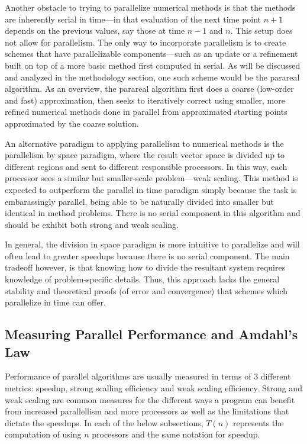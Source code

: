 \documentclass[letterpaper,12pt]{article}
\begin{document}
Another obstacle to trying to parallelize numerical methods is that the methods
are inherently serial in time---in that evaluation of the next time point $n+1$
depends on the previous values, say those at time $n-1$ and $n$. This setup
does not allow for parallelism. The only way to incorporate parallelism is to
create schemes that have parallelizable components---such as an update or a
refinement built on top of a more basic method first computed in serial. As will be discussed and analyzed in the
methodology section, one such scheme would be the parareal algorithm. As an
overview, the parareal algorithm first does a coarse (low-order and fast)
approximation, then seeks to iteratively correct using smaller, more refined
numerical methods done in parallel from approximated starting points
approximated by the coarse solution.

An alternative paradigm to applying parallelism to numerical methods is the
parallelism by space paradigm, where the result vector space is divided up to
different regions and sent to different responsible processors. In this way,
each processor sees a similar but smaller-scale problem---weak scaling. This
method is expected to outperform the parallel in time paradigm simply because
the task is embarassingly parallel, being able to be naturally divided
into smaller but identical in method problems. There is no serial component in
this algorithm and should be exhibit both strong and weak scaling.

In general, the division in space paradigm is more intuitive to parallelize and
will often lead to greater speedups because there is no serial component. The main tradeoff however, is that knowing how to divide the resultant system requires knowledge of problem-specific details. Thus, this approach lacks the
general stability and theoretical proofs (of error and convergence) that schemes which parallelize in
time can offer.

\subsection{Measuring Parallel Performance and Amdahl's Law}

Performance of parallel algorithms are usually measured in terms of 3 different metrics: speedup, strong scalling efficiency and weak scaling efficiency.  Strong and weak scaling are common measures for the different ways a program can benefit from increased parallellism and more processors as well as the limitations that dictate the speedups. In each of the below subsections, $T(n)$ represents the computation of using $n$ processors and the same notation for speedup.
\end{document}
